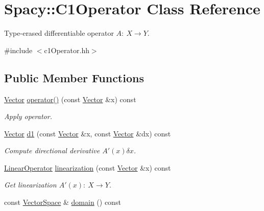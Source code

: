 \hypertarget{classSpacy_1_1C1Operator}{}\section{Spacy\+:\+:C1\+Operator Class Reference}
\label{classSpacy_1_1C1Operator}


Type-\/erased differentiable operator $A:\ X \to Y $.  




{\ttfamily \#include $<$c1\+Operator.\+hh$>$}

\subsection*{Public Member Functions}
\begin{DoxyCompactItemize}
\item 
\hyperlink{classSpacy_1_1Vector}{Vector} \hyperlink{classSpacy_1_1C1Operator_a2a01bf08bf2b6e44955cd606aa3db91d}{operator()} (const \hyperlink{classSpacy_1_1Vector}{Vector} \&x) const \hypertarget{classSpacy_1_1C1Operator_a2a01bf08bf2b6e44955cd606aa3db91d}{}\label{classSpacy_1_1C1Operator_a2a01bf08bf2b6e44955cd606aa3db91d}

\begin{DoxyCompactList}\small\item\em Apply operator. \end{DoxyCompactList}\item 
\hyperlink{classSpacy_1_1Vector}{Vector} \hyperlink{classSpacy_1_1C1Operator_a1b6a06c88bc4168c750ee4ffdc81f1dd}{d1} (const \hyperlink{classSpacy_1_1Vector}{Vector} \&x, const \hyperlink{classSpacy_1_1Vector}{Vector} \&dx) const \hypertarget{classSpacy_1_1C1Operator_a1b6a06c88bc4168c750ee4ffdc81f1dd}{}\label{classSpacy_1_1C1Operator_a1b6a06c88bc4168c750ee4ffdc81f1dd}

\begin{DoxyCompactList}\small\item\em Compute directional derivative $A'(x)\delta x$. \end{DoxyCompactList}\item 
\hyperlink{classSpacy_1_1LinearOperator}{Linear\+Operator} \hyperlink{classSpacy_1_1C1Operator_a71aabe09ec29a8a1bb197eef035d6672}{linearization} (const \hyperlink{classSpacy_1_1Vector}{Vector} \&x) const \hypertarget{classSpacy_1_1C1Operator_a71aabe09ec29a8a1bb197eef035d6672}{}\label{classSpacy_1_1C1Operator_a71aabe09ec29a8a1bb197eef035d6672}

\begin{DoxyCompactList}\small\item\em Get linearization $A'(x):\ X\to Y $. \end{DoxyCompactList}\item 
const \hyperlink{classSpacy_1_1VectorSpace}{Vector\+Space} \& \hyperlink{classSpacy_1_1C1Operator_aee0ffd5cee0b8a8df2f0b67b5aaf0ddb}{domain} () const \hypertarget{classSpacy_1_1C1Operator_aee0ffd5cee0b8a8df2f0b67b5aaf0ddb}{}\label{classSpacy_1_1C1Operator_aee0ffd5cee0b8a8df2f0b67b5aaf0ddb}


\end{DoxyCompactItemize}
